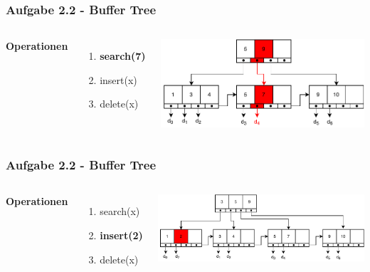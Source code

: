 \documentclass[aspectratio=169]{beamer}
\begin{document}
\begin{frame}
	\frametitle{Aufgabe 2.2 - Buffer Tree}
	\begin{columns}[c] %
		
		\textbf{Operationen}
		\begin{enumerate}
			\item \textbf{search(7)}
			\item insert(x)
			\item delete(x)
		\end{enumerate}
		
		\includegraphics[scale=.6]{bplus_querry_7.pdf}
		
	
		
	\end{columns}
	\end{frame}
	

	\begin{frame}
		\frametitle{Aufgabe 2.2 - Buffer Tree}
		\begin{columns}[c] %
			
			\textbf{Operationen}
			\begin{enumerate}
				\item search(x)
				\item \textbf{insert(2)}
				\item delete(x)
			\end{enumerate}
			
			\includegraphics[scale=.6]{bplus_insert_2.pdf}
			
		
			
		\end{columns}
		\end{frame}
		
\end{document}
